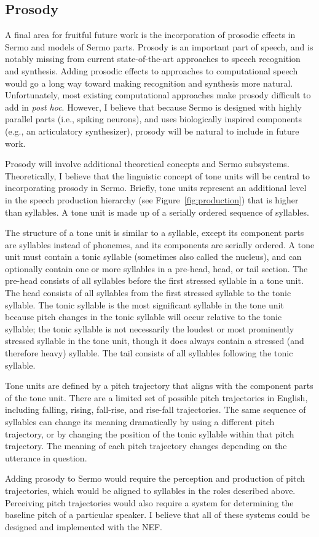 \subsection{Prosody}

A final area for fruitful future work
is the incorporation of prosodic effects
in Sermo and models of Sermo parts.
Prosody is an important part of speech,
and is notably missing from
current state-of-the-art approaches
to speech recognition and synthesis.
Adding prosodic effects to approaches
to computational speech would go a long way
toward making recognition and synthesis more natural.
Unfortunately, most existing computational approaches
make prosody difficult to add in
\textit{post hoc}.
However, I believe that because Sermo
is designed with highly parallel parts
(i.e., spiking neurons),
and uses biologically inspired components
(e.g., an articulatory synthesizer),
prosody will be natural to include
in future work.

Prosody will involve additional theoretical concepts
and Sermo subsystems.
Theoretically, I believe that the linguistic concept
of tone units will be central to incorporating
prosody in Sermo.
Briefly, tone units represent an additional
level in the speech production hierarchy
(see Figure~\ref{fig:production})
that is higher than syllables.
A tone unit is made up of a serially ordered
sequence of syllables.

The structure of a tone unit is similar
to a syllable, except its component parts
are syllables instead of phonemes,
and its components are serially ordered.
A tone unit must contain a tonic syllable
(sometimes also called the nucleus),
and can optionally contain one or more syllables
in a pre-head, head, or tail section.
The pre-head consists of all syllables
before the first stressed syllable
in a tone unit.
The head consists of all syllables from
the first stressed syllable
to the tonic syllable.
The tonic syllable is the most significant
syllable in the tone unit because
pitch changes in the tonic syllable
will occur relative to the tonic syllable;
the tonic syllable is not necessarily
the loudest or most prominently stressed
syllable in the tone unit,
though it does always contain
a stressed (and therefore heavy) syllable.
The tail consists of all syllables
following the tonic syllable.

Tone units are defined by
a pitch trajectory that aligns with
the component parts of the tone unit.
There are a limited set of possible
pitch trajectories in English,
including falling, rising,
fall-rise, and rise-fall trajectories.
The same sequence of syllables
can change its meaning dramatically
by using a different pitch trajectory,
or by changing the position of the
tonic syllable within that pitch trajectory.
The meaning of each pitch trajectory
changes depending on the utterance in question.

Adding prosody to Sermo
would require the perception and production
of pitch trajectories,
which would be aligned to syllables
in the roles described above.
Perceiving pitch trajectories would also require
a system for determining the baseline pitch
of a particular speaker.
I believe that all of these systems
could be designed and implemented
with the NEF.
